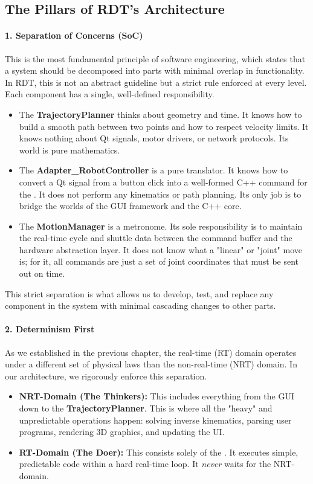 \subsection{The Pillars of RDT's Architecture}
\label{subsec:rdt_pillars}

\paragraph{1. Separation of Concerns (SoC)}
This is the most fundamental principle of software engineering, which states that a system should be decomposed into parts with minimal overlap in functionality. In RDT, this is not an abstract guideline but a strict rule enforced at every level. Each component has a single, well-defined responsibility.
\begin{itemize}
    \item The \textbf{TrajectoryPlanner} thinks about geometry and time. It knows how to build a smooth path between two points and how to respect velocity limits. It knows nothing about Qt signals, motor drivers, or network protocols. Its world is pure mathematics.
    \item The \textbf{Adapter\_RobotController} is a pure translator. It knows how to convert a Qt signal from a button click into a well-formed C++ command for the . It does not perform any kinematics or path planning. Its only job is to bridge the worlds of the GUI framework and the C++ core.
    \item The \textbf{MotionManager} is a metronome. Its sole responsibility is to maintain the real-time cycle and shuttle data between the command buffer and the hardware abstraction layer. It does not know what a "linear" or "joint" move is; for it, all commands are just a set of joint coordinates that must be sent out on time.
\end{itemize}
This strict separation is what allows us to develop, test, and replace any component in the system with minimal cascading changes to other parts.

\paragraph{2. Determinism First}
As we established in the previous chapter, the real-time (RT) domain operates under a different set of physical laws than the non-real-time (NRT) domain. In our architecture, we rigorously enforce this separation.
\begin{itemize}
    \item \textbf{NRT-Domain (The Thinkers):} This includes everything from the GUI down to the \textbf{TrajectoryPlanner}. This is where all the "heavy" and unpredictable operations happen: solving inverse kinematics, parsing user programs, rendering 3D graphics, and updating the UI.
    \item \textbf{RT-Domain (The Doer):} This consists solely of the . It executes simple, predictable code within a hard real-time loop. It \textit{never} waits for the NRT-domain.
\end{itemize}

